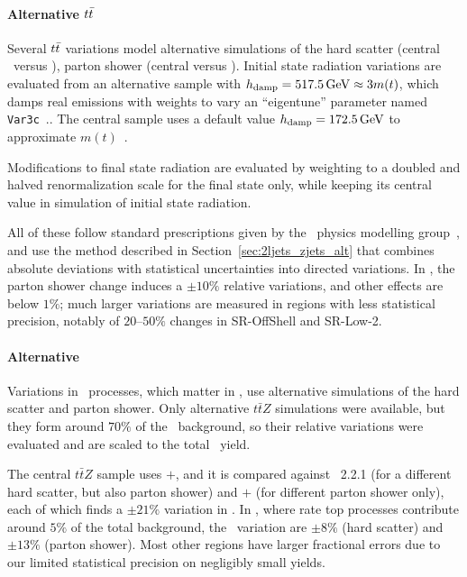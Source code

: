 \paragraph{Alternative $\ttbar$}
Several $\ttbar$ variations model alternative simulations of the
hard scatter (central \powheg\ versus \amcatnlo),
parton shower (central  versus ).
Initial state radiation variations are evaluated from an alternative
sample with $h_\textrm{damp} = 517.5\,\eV[G] \approx 3m(t)$,
which damps real emissions with weights to vary an ``eigentune'' parameter
named \texttt{Var3c}~\cite{ATL-PHYS-PUB-2014-021}..
The central sample uses a default value $h_\textrm{damp} = 172.5\,\eV[G]$ to
approximate $m(t)$~\cite{CMS-PAS-TOP-16-021}.

Modifications to final state radiation are evaluated by weighting to a doubled
and halved renormalization scale for the final state only, while keeping
its central value in simulation of initial state radiation.

All of these follow standard prescriptions given by the \atlas\ physics
modelling group~\cite{atlas_twiki_top}, and use the method described in
Section~\ref{sec:2ljets_zjets_alt} that combines absolute deviations with
statistical uncertainties into directed variations.
In \crtt, the parton shower change induces a $\pm10\%$ relative variations,
and other effects are below $1\%$; much larger variations are measured in
regions with less statistical precision, notably of $20\textrm{--}50\%$ changes
in SR-OffShell and SR-Low-2.

\paragraph{Alternative \topother}
Variations in \topother\ processes, which matter in \srllbb, use
alternative simulations of the hard scatter and parton shower.
Only alternative $t\bar{t}Z$ simulations were available, but they form around
$70\%$ of the \topother\ background, so their relative variations were evaluated
and are scaled to the total \topother\ yield.

The central $t\bar{t}Z$ sample uses \amcatnlo$+$, and it is compared
against \pythia~2.2.1 (for a different hard scatter, but also parton shower)
and \amcatnlo$+$ (for different parton shower only), each of which
finds a $\pm21\%$ variation in \srllbb.
In \crtt,
where rate top processes contribute around $5\%$ of the total background,
the \topother\ variation are
$\pm8\%$ (hard scatter) and
$\pm13\%$ (parton shower).
Most other regions have larger fractional errors due to our limited
statistical precision on negligibly small yields.

